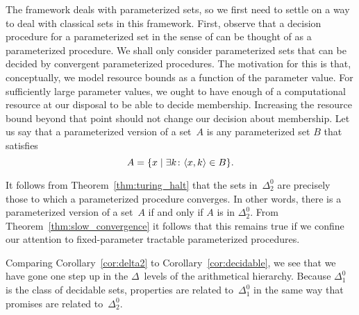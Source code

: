 \begin{example}
  The \citeauthor{downey1999parameterized} framework deals with parameterized sets, so we first need to settle on a way to deal with classical sets in this framework.
  First, observe that a decision procedure for a parameterized set in the sense of \citeauthor{downey1999parameterized} can be thought of as a parameterized procedure.
  We shall only consider parameterized sets that can be decided by convergent parameterized procedures.
  The motivation for this is that, conceptually, we model resource bounds as a function of the parameter value.
  For sufficiently large parameter values, we ought to have enough of a computational resource at our disposal to be able to decide membership.
  Increasing the resource bound beyond that point should not change our decision about membership.
  Let us say that a parameterized version of a set~$A$ is any parameterized set $B$ that satisfies
  \begin{equation*}
    A = \{x \;|\; \exists k\colon {\langle x, k\rangle} \in B\}.
  \end{equation*}

  It follows from Theorem~\ref{thm:turing_halt} that the sets in~$\Delta^0_2$ are precisely those to which a parameterized procedure converges.
  In other words, there is a parameterized version of a set~$A$ if and only if $A$ is in $\Delta^0_2$.
  From Theorem~\ref{thm:slow_convergence} it follows that this remains true if we confine our attention to fixed-parameter tractable parameterized procedures.
\end{example}

Comparing Corollary~\ref{cor:delta2} to Corollary~\ref{cor:decidable}, we see that we have gone one step up in the $\Delta$~levels of the arithmetical hierarchy.
Because $\Delta^0_1$ is the class of decidable sets, properties are related to~$\Delta^0_1$ in the same way that promises are related to~$\Delta^0_2$.

